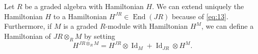 \documentclass[a4paper, 12pt, reqno]{amsart}
\theoremstyle{remark}
\DeclareMathOperator{\End}{End}
\DeclareMathOperator{\Id}{Id}
\begin{document}
Let $R$ be a graded algebra with Hamiltonian $H$.
We can extend uniquely the Hamiltonian $H$ to a Hamiltonian $H^{JR} \in \End(JR)$ because of \eqref{eq:13}.
Furthermore, if $M$ is a graded $R$-module with Hamiltonian $H^M$, we can define a Hamiltonian of $JR \otimes_R M$ by setting
\begin{equation*}
  H^{JR \otimes_R M} = H^{JR}\otimes\Id_{M} + \Id_{JR}\otimes H^M.
\end{equation*}



\end{document}
